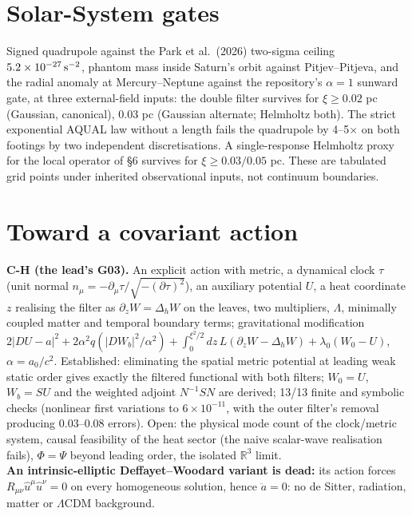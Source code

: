 \documentclass[11pt,letterpaper]{article}
\begin{document}
\section{Solar-System gates}
Signed quadrupole against the Park et al.\ (2026) two-sigma ceiling $5.2\times10^{-27}\,{\rm s^{-2}}$, phantom mass inside Saturn's orbit against Pitjev--Pitjeva, and the radial anomaly at Mercury--Neptune against the repository's $\alpha=1$ sunward gate, at three external-field inputs: the double filter survives for $\xi\ge0.02$ pc (Gaussian, canonical), $0.03$ pc (Gaussian alternate; Helmholtz both). The strict exponential AQUAL law without a length fails the quadrupole by 4--5$\times$ on both footings by two independent discretisations. A single-response Helmholtz proxy for the local operator of \S6 survives for $\xi\ge0.03/0.05$ pc. These are tabulated grid points under inherited observational inputs, not continuum boundaries.
\section{Toward a covariant action}
\textbf{C-H (the lead's G03).} An explicit action with metric, a dynamical clock $\tau$ (unit normal $n_\mu=-\partial_\mu\tau/\sqrt{-(\partial\tau)^2}$), an auxiliary potential $U$, a heat coordinate $z$ realising the filter as $\partial_zW=\Delta_hW$ on the leaves, two multipliers, $\Lambda$, minimally coupled matter and temporal boundary terms; gravitational modification $2|DU-a|^2+2\alpha^2q(|DW_b|^2/\alpha^2)+\int_0^{\xi^2/2}dz\,L(\partial_zW-\Delta_hW)+\lambda_0(W_0-U)$, $\alpha=a_0/c^2$. Established: eliminating the spatial metric potential at leading weak static order gives exactly the filtered functional with both filters; $W_0=U$, $W_b=SU$ and the weighted adjoint $N^{-1}SN$ are derived; 13/13 finite and symbolic checks (nonlinear first variations to $6\times10^{-11}$, with the outer filter's removal producing $0.03$--$0.08$ errors). Open: the physical mode count of the clock/metric system, causal feasibility of the heat sector (the naive scalar-wave realisation fails), $\Phi=\Psi$ beyond leading order, the isolated $\mathbb R^3$ limit.\\
\textbf{An intrinsic-elliptic Deffayet--Woodard variant is dead:} its action forces $R_{\mu\nu}\hat u^\mu\hat u^\nu=0$ on every homogeneous solution, hence $\ddot a=0$: no de Sitter, radiation, matter or $\Lambda$CDM background.
\end{document}
